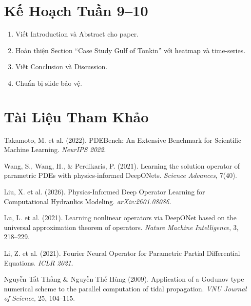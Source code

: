 \documentclass[12pt,a4paper]{article}
\begin{document}
\section{Kế Hoạch Tuần 9--10}

\begin{enumerate}[nosep]
  \item Viết Introduction và Abstract cho paper.
  \item Hoàn thiện Section ``Case Study Gulf of Tonkin'' với heatmap và time-series.
  \item Viết Conclusion và Discussion.
  \item Chuẩn bị slide bảo vệ.
\end{enumerate}

\section*{Tài Liệu Tham Khảo}

\begin{enumerate}[label={[\arabic*]}, nosep]
  \item Takamoto, M. et al. (2022). PDEBench: An Extensive Benchmark for Scientific Machine Learning. \textit{NeurIPS 2022}.
  \item Wang, S., Wang, H., \& Perdikaris, P. (2021). Learning the solution operator of parametric PDEs with physics-informed DeepONets. \textit{Science Advances}, 7(40).
  \item Liu, X. et al. (2026). Physics-Informed Deep Operator Learning for Computational Hydraulics Modeling. \textit{arXiv:2601.08086}.
  \item Lu, L. et al. (2021). Learning nonlinear operators via DeepONet based on the universal approximation theorem of operators. \textit{Nature Machine Intelligence}, 3, 218--229.
  \item Li, Z. et al. (2021). Fourier Neural Operator for Parametric Partial Differential Equations. \textit{ICLR 2021}.
  \item Nguyễn Tất Thắng \& Nguyễn Thế Hùng (2009). Application of a Godunov type numerical scheme to the parallel computation of tidal propagation. \textit{VNU Journal of Science}, 25, 104--115.
\end{enumerate}
\end{document}
